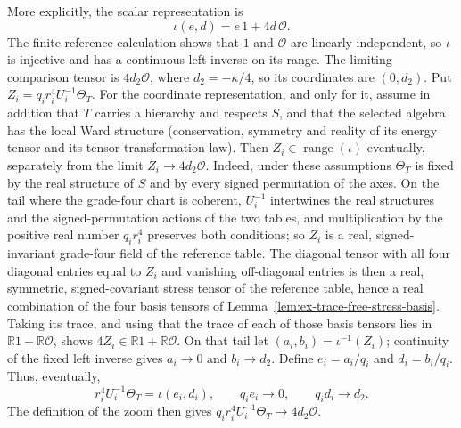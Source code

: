 More explicitly, the scalar representation is
\[
 \iota(e,d)=e\,1+4d\,\mathcal O.
\]
The finite reference calculation shows that $1$ and $\mathcal O$ are
linearly independent, so $\iota$ is injective and has a continuous left
inverse on its range.
The limiting comparison tensor is $4d_2\mathcal O$, where
$d_2=-\kappa/4$, so its coordinates are $(0,d_2)$. Put
$Z_i=q_i r_i^4U_i^{-1}\Theta_T$. For the coordinate representation,
and only for it, assume in addition that $T$ carries a hierarchy and
respects $S$, and that the selected algebra has the local Ward structure
(conservation, symmetry and reality of its energy tensor and its tensor
transformation law). Then
$Z_i\in\operatorname{range}(\iota)$ eventually, separately from the limit
$Z_i\to4d_2\mathcal O$. Indeed, under these assumptions $\Theta_T$ is
fixed by the real structure of $S$ and by every signed permutation of the
axes. On the tail where the grade-four chart is coherent, $U_i^{-1}$
intertwines the real structures and the signed-permutation actions of
the two tables, and multiplication by the positive real number
$q_ir_i^4$ preserves both conditions; so $Z_i$ is a real,
signed-invariant grade-four field of the reference table. The diagonal
tensor with all four diagonal entries equal to $Z_i$ and vanishing
off-diagonal entries is then a real, symmetric, signed-covariant stress
tensor of the reference table, hence a real combination of the four basis
tensors of Lemma~\ref{lem:ex-trace-free-stress-basis}. Taking its trace,
and using that the trace of each of those basis tensors lies in
$\mathbb R1+\mathbb R\mathcal O$, shows
$4Z_i\in\mathbb R1+\mathbb R\mathcal O$. On that tail let $(a_i,b_i)=\iota^{-1}(Z_i)$;
continuity of the fixed left inverse gives $a_i\to0$ and $b_i\to d_2$.
Define $e_i=a_i/q_i$ and $d_i=b_i/q_i$. Thus, eventually,
\[
 r_i^4U_i^{-1}\Theta_T=\iota(e_i,d_i),
 \qquad q_i e_i\to0,\qquad q_i d_i\to d_2.
\]
The definition of the zoom then gives
$q_i r_i^4U_i^{-1}\Theta_T\to4d_2\mathcal O$.

